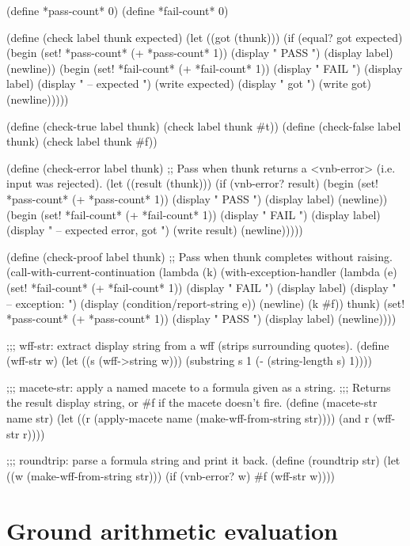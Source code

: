 \begin{VNBcode}
(define *pass-count* 0)
(define *fail-count* 0)

(define (check label thunk expected)
  (let ((got (thunk)))
    (if (equal? got expected)
        (begin (set! *pass-count* (+ *pass-count* 1))
               (display "  PASS  ") (display label) (newline))
        (begin (set! *fail-count* (+ *fail-count* 1))
               (display "  FAIL  ") (display label)
               (display " -- expected ") (write expected)
               (display " got ") (write got) (newline)))))

(define (check-true  label thunk) (check label thunk #t))
(define (check-false label thunk) (check label thunk #f))

(define (check-error label thunk)
  ;; Pass when thunk returns a <vnb-error> (i.e. input was rejected).
  (let ((result (thunk)))
    (if (vnb-error? result)
        (begin (set! *pass-count* (+ *pass-count* 1))
               (display "  PASS  ") (display label) (newline))
        (begin (set! *fail-count* (+ *fail-count* 1))
               (display "  FAIL  ") (display label)
               (display " -- expected error, got ") (write result) (newline)))))

(define (check-proof label thunk)
  ;; Pass when thunk completes without raising.
  (call-with-current-continuation
    (lambda (k)
      (with-exception-handler
        (lambda (e)
          (set! *fail-count* (+ *fail-count* 1))
          (display "  FAIL  ") (display label)
          (display " -- exception: ")
          (display (condition/report-string e)) (newline)
          (k #f))
        thunk)
      (set! *pass-count* (+ *pass-count* 1))
      (display "  PASS  ") (display label) (newline))))

;;; wff-str: extract display string from a wff (strips surrounding quotes).
(define (wff-str w)
  (let ((s (wff->string w)))
    (substring s 1 (- (string-length s) 1))))

;;; macete-str: apply a named macete to a formula given as a string.
;;; Returns the result display string, or #f if the macete doesn't fire.
(define (macete-str name str)
  (let ((r (apply-macete name (make-wff-from-string str))))
    (and r (wff-str r))))

;;; roundtrip: parse a formula string and print it back.
(define (roundtrip str)
  (let ((w (make-wff-from-string str)))
    (if (vnb-error? w) #f (wff-str w))))
\end{VNBcode}

\section{Ground arithmetic evaluation}

